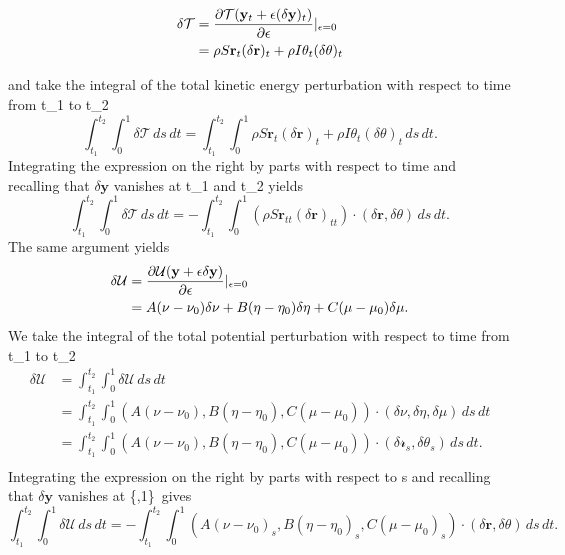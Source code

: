 \documentclass[12pt]{article}
\newcommand{\cB}{B}
\newcommand{\cA}{A}
\newcommand{\cC}{C}
\begin{document}
\begin{equation}
\begin{split}
 \delta\mathcal{T}& = \frac{\partial \mathcal{T}(\mathbf{y}_t + \epsilon (\delta \mathbf{y})_t )}{\partial{\epsilon}} \arrowvert_{\epsilon=0}\\
                  & = \rho S\mathbf{r}_t (\delta\mathbf{r})_t + \rho I \theta_t (\delta \theta)_t\\
\end{split}
\end{equation}

and take the integral of the total kinetic energy perturbation with respect to time from t_1 to t_2
\[\int_{t_1}^{t_2} \int_{0}^{1} \delta \mathcal{T}\, ds \, dt = \int_{t_1}^{t_2} \int_{0}^{1} \rho S\mathbf{r}_t (\delta\mathbf{r})_t + \rho I \theta_t (\delta \theta)_t\, ds \, dt.
\]
Integrating the expression on the right by parts with respect to time and recalling that $\delta\mathbf{y}$ vanishes at t_1 and t_2  yields
\[\int_{t_1}^{t_2}\int_{0}^{1}\delta \mathcal{T}\,ds\,dt = -\int_{t_1}^{t_2}\int_{0}^{1}(\rho S\mathbf{r}_{tt}(\delta\mathbf{r})_{tt})\cdot(\delta\mathbf{r},\delta\theta)\,ds\,dt.
\]
The same argument yields
\begin{equation}
\begin{split}
 \delta\mathcal{U}& = \frac{\partial \mathcal{U}(\mathbf{y} + \epsilon\delta\mathbf{y})}{\partial{\epsilon}} \arrowvert_{\epsilon=0}\\
                  & = \cA(\nu-\nu_{0})\delta\nu+\cB(\eta-\eta_0)\delta\eta+\cC(\mu-\mu_0)\delta\mu.\\
\end{split}
\end{equation}
We take the integral of the total potential perturbation with respect to time from t_1 to t_2
\begin{equation}
\begin{split}
 \delta\mathcal{U}& = \int_{t_1}^{t_2}\int_{0}^{1}\delta\mathcal{U}\,ds\,dt \\
                  & = \int_{t_1}^{t_2} \int_{0}^{1} 
(\cA(\nu-\nu_{0}),\cB(\eta-\eta_0),\cC(\mu-\mu_0))\cdot(\delta\nu,\delta\eta,\delta\mu)\,ds\,dt\\
                  & = \int_{t_1}^{t_2} \int_{0}^{1} 
(\cA(\nu-\nu_{0}),\cB(\eta-\eta_0),\cC(\mu-\mu_0))\cdot(\delta \mathcal{r}_s,\delta\theta_s)\,ds\,dt.\\
\end{split}
\end{equation}
Integrating the expression on the right by parts with respect to s and recalling that $\delta\mathbf{y}$ vanishes at \{\0,1\}\ gives
\[\int_{t_1}^{t_2}\int_{0}^{1}\delta\mathcal{U}\,ds\,dt =
-\int_{t_1}^{t_2} \int_{0}^{1} 
(\cA(\nu-\nu_{0})_s,\cB(\eta-\eta_0)_s,\cC(\mu-\mu_0)_s)\cdot(\delta\mathbf{r},\delta\theta)\,ds\,dt.
\]
\end{document}
